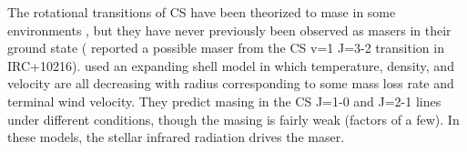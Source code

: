 \documentclass[twocolumn]{aastex62}
\begin{document}

The rotational transitions of CS have been theorized to mase
in some environments \citep{Schoenberg1988a}, but they have
never previously been observed as masers in their ground state
(\citealt{Highberger2000a} reported a possible maser from the CS v=1 J=3-2
transition in IRC+10216).
\citet{Schoenberg1988a}
used an expanding shell model in which temperature, density, and
velocity are all decreasing with radius corresponding to some
mass loss rate and terminal wind velocity. They predict masing
in the CS J=1-0 and J=2-1 lines under different conditions, though the
masing is fairly weak (factors of a few).  In these models,
the stellar infrared radiation drives the maser.
\end{document}
